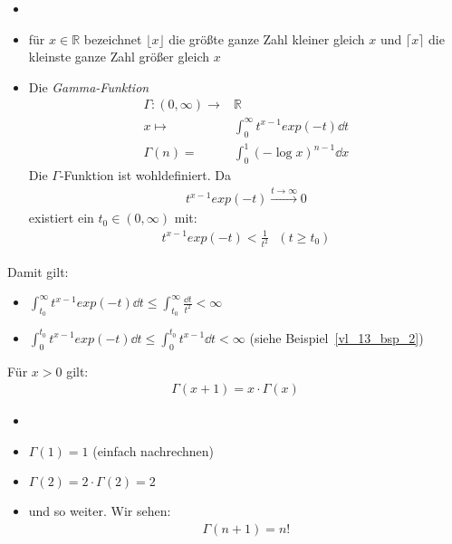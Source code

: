 \begin{Bemerkung}{
	\begin{itemize}
		\item[ ]
		\item für $x \in \mathbb{R}$ bezeichnet $\lfloor x \rfloor$ die größte ganze 
		Zahl kleiner gleich $x$ und $\lceil x \rceil$ die kleinste ganze Zahl größer 
		gleich $x$
	\end{itemize}
}\end{Bemerkung}

\begin{itemize}
	\item Die \emph{Gamma-Funktion} 
	\begin{align*}
		\Gamma : (0, \infty) \rightarrow & \mathbb{R} \\
		x \mapsto & \int_0^{\infty} t^{x-1}exp(-t) \dd{t} \\
		\Gamma(n) = & \int_0^1 (- \log x)^{n-1} \dd{x}
	\end{align*}
	Die $\Gamma$-Funktion ist wohldefiniert. Da 
	\begin{align*}
	t^{x-1}exp(-t) \overset{t \rightarrow \infty}{\longrightarrow} 0 
	\end{align*}			
	existiert ein $t_0 \in (0, \infty)$ mit:
	\begin{align*}
		t^{x-1}exp(-t) < \frac{1}{t^2} \text{ }( t \geq t_0)
	\end{align*}
\end{itemize}
Damit gilt:
\begin{itemize}
	\item $\int_{t_0}^{\infty} t^{x-1}exp(-t) \dd{t} \leq \int_{t_0}^{\infty}
	\frac{\dd{t}}{t^2} < \infty$
	\item $\int_0^{t_0} t^{x-1}exp(-t) \dd{t} \leq \int_0^{t_0} t^{x-1} \dd{t} < 
	\infty$ (siehe Beispiel~\ref{vl_13_bsp_2})
\end{itemize}

\begin{Satz}{
	Für $x > 0 $ gilt:
	\begin{align*}
		\Gamma (x +1) = x \cdot \Gamma(x)
	\end{align*}
}\end{Satz}

\begin{Bemerkung}{
	\begin{itemize}
		\item[ ]
		\item $\Gamma(1) = 1$ (einfach nachrechnen)
		\item $\Gamma(2) = 2 \cdot \Gamma(2) = 2$ 
		\item[ ] und so weiter. Wir sehen: 
		\begin{align*}
			\Gamma(n+1) = n !
		\end{align*}
	\end{itemize}
}\end{Bemerkung}

